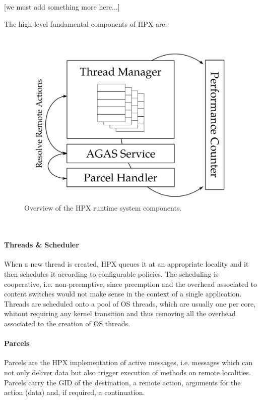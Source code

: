 [\TODO we must add something more here...]

The high-level fundamental components of HPX are:

\begin{figure}[b]
 	\begin{center}
 		\includegraphics[scale=0.18]{Figures/hpxArchitecture.png}
 		\caption{Overview of the HPX runtime system components\cite{heller2017hpx}.}\label{fig:hpxArchitecture}
 	\end{center}
\end{figure}
\\ 

\paragraph{Threads \& Scheduler}
When a new thread is created, HPX queues it at an appropriate locality and it then schedules it according to configurable policies. The scheduling is cooperative, i.e. non-preemptive, since preemption and the overhead associated to content switches would not make sense in the context of a single application. Threads are scheduled onto a pool of OS threads, which are usually one per core, whitout requiring any kernel transition and thus removing all the overhead associated to the creation of OS threads.
\\ 

\paragraph{Parcels}
Parcels are the HPX implementation of active messages, i.e. messages which can not only deliver data but also trigger execution of methods on remote localities.
Parcels carry the GID of the destination, a remote action, arguments for the action (data) and, if required, a continuation.
\\ 

